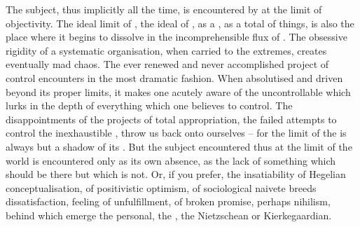 \pa The subject, thus implicitly  all the time, is encountered by
 at the limit of {objectivity}. The ideal limit of , the
ideal  of , 
 as a , as a total  of things, is also
the place where it begins to dissolve in the incomprehensible flux of .
The obsessive rigidity of a systematic organisation, when carried to the
extremes, creates eventually mad 
chaos.  The ever renewed and never accomplished project of control encounters
 in the most dramatic fashion.  When absolutised and driven beyond its
proper limits, it makes one acutely aware of the uncontrollable  which
lurks in the depth of everything which one believes to control.  The
disappointments of the projects of total appropriation, the failed attempts to
control the inexhaustible , throw us back onto ourselves -- for the
limit of the  is always but a shadow of its
. But the subject encountered thus at the limit of the world
is encountered only as its own absence, as the lack of something which should be
there but which is not.  Or, if you prefer, the insatiability of Hegelian
conceptualisation, of positivistic optimism, of sociological naivete breeds
dissatisfaction, feeling of unfulfillment, of broken promise, perhaps nihilism,
behind which
emerge the personal, the , the Nietzschean or Kierkegaardian.


